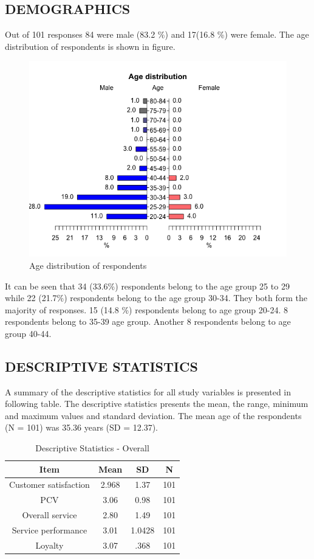 \documentclass[a4paper, 14pt]{extarticle}
\begin{document}
{\subsection{DEMOGRAPHICS}
Out of 101 responses 84 were male (83.2 \%) and 17(16.8 \%) were female. The age distribution of respondents is shown in figure.
\begin{figure}[H]
\centering
\includegraphics[scale=0.7]{age.png}
\caption{Age distribution of respondents}
\end{figure}
It can be seen that 34 (33.6\%) respondents belong to the age group 25 to 29 while 22 (21.7\%) respondents belong to the age group 30-34. They both form the majority of responses. 15 (14.8 \%) respondents belong to age group 20-24. 8 respondents belong to 35-39 age group. Another 8 respondents belong to age group 40-44.

\subsection{DESCRIPTIVE STATISTICS}
A summary of the descriptive statistics for all study variables is presented in following table. The descriptive statistics presents the mean, the range, minimum and maximum values and standard deviation. The mean age of the respondents (N = 101) was 35.36 years (SD = 12.37). 

\begin{table}[H]
\centering
\begin{tabular}{|c|c|c|c|}
\hline
Item & \textbf{Mean} & \textbf{SD} & N \\
\hline
Customer satisfaction & 2.968 & 1.37 & 101 \\
\hline
PCV & 3.06 & 0.98 & 101 \\
\hline
Overall service & 2.80 & 1.49 & 101 \\
\hline
Service performance & 3.01 & 1.0428 & 101 \\
\hline
Loyalty & 3.07 & .368 & 101 \\
\hline
\end{tabular}
\caption{Descriptive Statistics - Overall}
\end{table} 

}
\end{document}
